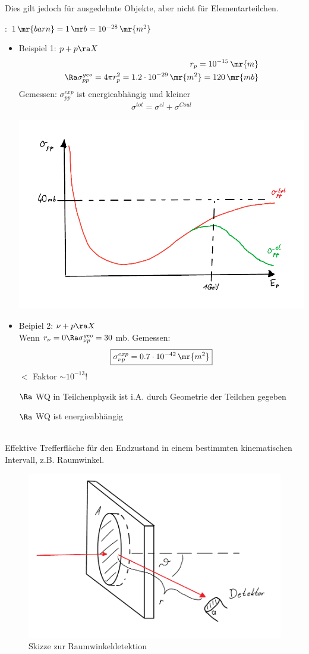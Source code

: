 Dies gilt jedoch  für ausgedehnte Objekte, aber nicht für Elementarteilchen.
\begin{framed}
: $1\,\mr{barn}=1\,\mr b = 10^{-28}\,\mr{m^2}$
\end{framed}
\begin{itemize}
\item Beispiel 1: $p+p \ra X$
\begin{align}
\begin{split}
r_p = 10^{-15}\,\mr{m}\\
\Ra \sigma_{pp}^{geo} = 4\pi r_p^2 = 1.2 \cdot 10^{-29}\,\mr{m^2} = 120\,\mr{mb}
\end{split}
\end{align}
Gemessen: $\sigma_{pp}^{exp}$ ist energieabhängig und kleiner
\begin{align*}
\sigma^{tot} = \sigma^{el} + \sigma^{Coul}
\end{align*}
\begin{center}
\captionsetup{type=figure}
\includegraphics[width=.5\textwidth]{imgs/ep5-fig-3-3.pdf}
\end{center}

\item Beipiel 2: $\nu+p \ra X$\\
Wenn $r_\nu = 0 \Ra \sigma_{\nu p}^{geo} = 30$\,mb. Gemessen:
\begin{align}
\boxed{\sigma_{\nu p}^{exp} = 0.7\cdot 10^{-42}\,\mr{m^2}}
\end{align}
$\lt$ Faktor $\sim 10^{-13}$!
\item[$\Ra$] WQ in Teilchenphysik ist i.A.  durch Geometrie der Teilchen gegeben
\item[$\Ra$] WQ ist  energieabhängig
\end{itemize}

 \\
Effektive Trefferfläche für den Endzustand in einem bestimmten kinematischen Intervall, z.B. Raumwinkel.
\begin{figure}[!ht]
\centering
\includegraphics[width=.5\textwidth]{imgs/ep5-fig-3-4.pdf}
\caption{Skizze zur Raumwinkeldetektion}
\end{figure}

